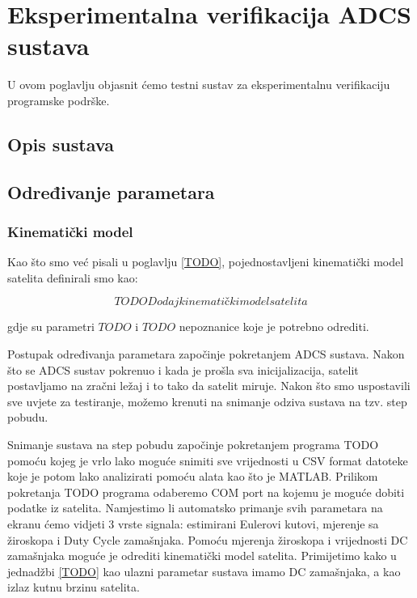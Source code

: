 \documentclass[times, utf8, diplomski, numeric]{templates/template}
\begin{document}
\chapter{Eksperimentalna verifikacija ADCS sustava}{
    U ovom poglavlju objasnit ćemo testni sustav za eksperimentalnu verifikaciju programske podrške. 

    \section{Opis sustava}{

    }

    \section{Određivanje parametara}{
        \subsection{Kinematički model}{
            Kao što smo već pisali u poglavlju \ref{TODO}, pojednostavljeni kinematički model satelita definirali smo kao:

            \begin{equation}
                TODO Dodaj kinematički model satelita
            \end{equation}

            gdje su parametri $TODO$ i $TODO$ nepoznanice koje je potrebno odrediti. 
            
            Postupak određivanja parametara započinje pokretanjem ADCS sustava. Nakon što se ADCS sustav pokrenuo i kada je prošla sva inicijalizacija, satelit postavljamo na zračni ležaj i to tako da satelit miruje. Nakon što smo uspostavili sve uvjete za testiranje, možemo krenuti na snimanje odziva sustava na tzv. step pobudu.

            Snimanje sustava na step pobudu započinje pokretanjem programa TODO pomoću kojeg je vrlo lako moguće snimiti sve vrijednosti u CSV format datoteke koje je potom lako analizirati pomoću alata kao što je MATLAB. Prilikom pokretanja TODO programa odaberemo COM port na kojemu je moguće dobiti podatke iz satelita. Namjestimo li automatsko primanje svih parametara na ekranu ćemo vidjeti 3 vrste signala: estimirani Eulerovi kutovi, mjerenje sa žiroskopa i Duty Cycle zamašnjaka. Pomoću mjerenja žiroskopa i vrijednosti DC zamašnjaka moguće je odrediti kinematički model satelita. Primijetimo kako u jednadžbi \ref{TODO} kao ulazni parametar sustava imamo DC zamašnjaka, a kao izlaz kutnu brzinu satelita. 

}}}
\end{document}
